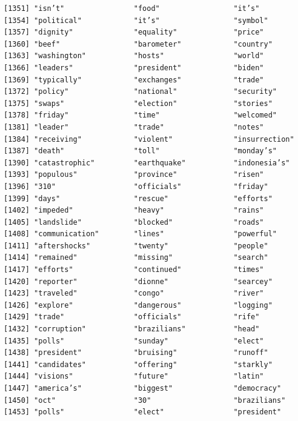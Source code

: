\documentclass[
  letterpaper,
  DIV=11,
  numbers=noendperiod]{scrartcl}
\begin{document}
\begin{verbatim}
[1351] "isn’t"                "food"                 "it’s"                
[1354] "political"            "it’s"                 "symbol"              
[1357] "dignity"              "equality"             "price"               
[1360] "beef"                 "barometer"            "country"             
[1363] "washington"           "hosts"                "world"               
[1366] "leaders"              "president"            "biden"               
[1369] "typically"            "exchanges"            "trade"               
[1372] "policy"               "national"             "security"            
[1375] "swaps"                "election"             "stories"             
[1378] "friday"               "time"                 "welcomed"            
[1381] "leader"               "trade"                "notes"               
[1384] "receiving"            "violent"              "insurrection"        
[1387] "death"                "toll"                 "monday’s"            
[1390] "catastrophic"         "earthquake"           "indonesia’s"         
[1393] "populous"             "province"             "risen"               
[1396] "310"                  "officials"            "friday"              
[1399] "days"                 "rescue"               "efforts"             
[1402] "impeded"              "heavy"                "rains"               
[1405] "landslide"            "blocked"              "roads"               
[1408] "communication"        "lines"                "powerful"            
[1411] "aftershocks"          "twenty"               "people"              
[1414] "remained"             "missing"              "search"              
[1417] "efforts"              "continued"            "times"               
[1420] "reporter"             "dionne"               "searcey"             
[1423] "traveled"             "congo"                "river"               
[1426] "explore"              "dangerous"            "logging"             
[1429] "trade"                "officials"            "rife"                
[1432] "corruption"           "brazilians"           "head"                
[1435] "polls"                "sunday"               "elect"               
[1438] "president"            "bruising"             "runoff"              
[1441] "candidates"           "offering"             "starkly"             
[1444] "visions"              "future"               "latin"               
[1447] "america’s"            "biggest"              "democracy"           
[1450] "oct"                  "30"                   "brazilians"          
[1453] "polls"                "elect"                "president"           

\end{verbatim}
\end{document}
